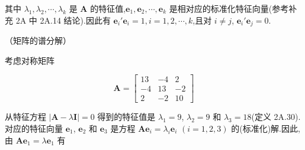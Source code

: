 其中 $\lambda_1, \lambda_2, \cdots, \lambda_k$ 是 $\bm{A}$ 的特征值,$\bm{e}_1, \bm{e}_2, \cdots, \bm{e}_k$ 是相对应的标准化特征向量(参考补充 2A 中 2A.14 结论).因此有 $\bm{e}_i'\bm{e}_i = 1, i = 1, 2, \cdots, k$,且对 $i \neq j$, $\bm{e}_i'\bm{e}_j = 0$.

 （矩阵的谱分解）

考虑对称矩阵

\[
\bm{A} = \begin{bmatrix} 13 & -4 & 2 \\ -4 & 13 & -2 \\ 2 & -2 & 10 \end{bmatrix}
\]

从特征方程 $|\bm{A} - \lambda\bm{I}| = 0$ 得到的特征值是 $\lambda_1 = 9$, $\lambda_2 = 9$ 和 $\lambda_3 = 18$(定义 2A.30).对应的特征向量 $\bm{e}_1$, $\bm{e}_2$ 和 $\bm{e}_3$ 是方程 $\bm{A}\bm{e}_i = \lambda_i\bm{e}_i$ $(i = 1, 2, 3)$ 的(标准化)解.因此,由 $\bm{A}\bm{e}_1 = \lambda\bm{e}_1$ 有
